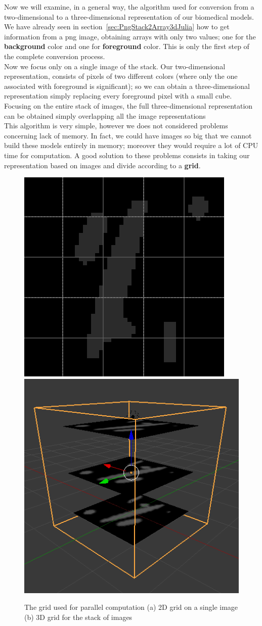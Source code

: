 \documentclass[11pt,oneside]{article}	%
\begin{document}
Now we will examine, in a general way, the algorithm used for conversion from a two-dimensional to a three-dimensional representation of our biomedical models.\\
We have already seen in section~\ref{sec:PngStack2Array3dJulia} how to get information from a png image, obtaining arrays with only two values; one for the \textbf{background} color and one for \textbf{foreground} color. This is only the first step of the complete conversion process.\\

Now we focus only on a single image of the stack. Our two-dimensional representation, consists of pixels of two different colors (where only the one associated with foreground is significant); so we can obtain a three-dimensional representation simply replacing every foreground pixel with a small cube. Focusing on the entire stack of images, the full three-dimensional representation can be obtained simply overlapping all the image representations\\

This algorithm is very simple, however we does not considered problems concerning lack of memory. In fact, we could have images so big that we cannot build these models entirely in memory; moreover they would require a lot of CPU time for computation. A good solution to these problems consists in taking our representation based on images and divide according to a \textbf{grid}.\\

\begin{figure}[htb] %
   \centering
   \includegraphics[width=0.45\linewidth]{images/imageGrid.png} \hfill
   \includegraphics[width=0.45\linewidth]{images/imageGrid3d.png}
   \caption{The grid used for parallel computation (a) 2D grid on a single image (b) 3D grid for the stack of images}
   \label{fig:rawImage}
\end{figure}
\end{document}
